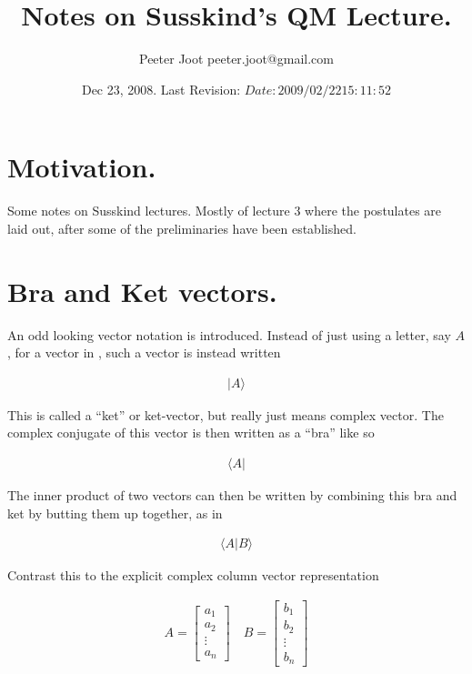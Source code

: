 \documentclass{article}
\title{ Notes on Susskind's QM Lecture. }
\author{Peeter Joot \quad peeter.joot@gmail.com}
\date{ Dec 23, 2008.  Last Revision: $Date: 2009/02/22 15:11:52 $ }
\newcommand{\ket}[1]{\lvert {#1} \rangle}
\newcommand{\bra}[1]{\langle {#1} \rvert}
\newcommand{\braket}[2]{\langle{#1} \vert {#2}\rangle}
\begin{document}
\maketitle{}


\section{ Motivation. }

Some notes on Susskind lectures.  Mostly of lecture 3 where the postulates are laid out, after some of the preliminaries have been established.

\section{ Bra and Ket vectors. }

An odd looking vector notation is introduced.  Instead of just using a letter, say $A$, for a vector in , such a
vector is instead written

\begin{align*}
\ket{A}
\end{align*}

This is called a ``ket'' or ket-vector, but really just means complex vector.   The complex conjugate of this
vector is then written as a ``bra'' like so

\begin{align*}
\bra{A}
\end{align*}

The inner product of two vectors can then be written by combining this bra and ket by butting them up together, as
in

\begin{align*}
\braket{A}{B}
\end{align*}

Contrast this to the explicit complex column vector representation

\begin{align*}
{A} = 
\begin{bmatrix}
a_1 \\
a_2 \\
\vdots \\
a_n
\end{bmatrix}
\quad
{B} = 
\begin{bmatrix}
b_1 \\
b_2 \\
\vdots \\
b_n
\end{bmatrix}
\end{align*}
\end{document}
